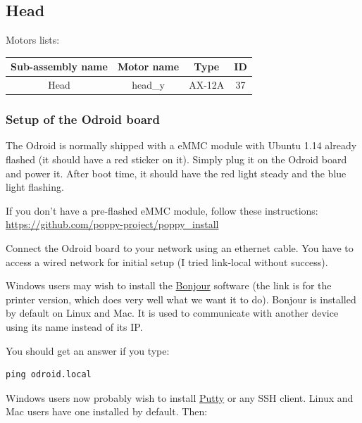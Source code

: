 \documentclass{article}
\begin{document}
\subsection{Head} 

Motors lists:

\begin{center}

\begin{tabular}{|c|c|c|c|}
\hline 
Sub-assembly name & Motor name & Type & ID \\ 
\hline 

Head & head\_y & AX-12A & 37 \\ 
\hline 
\end{tabular} 
\end{center}

\subsubsection{Setup of the Odroid board}


The Odroid is normally shipped with a eMMC module with Ubuntu 1.14 already flashed (it should have a red sticker on it). Simply plug it on the Odroid board and power it. After boot time, it should have the red light steady and the blue light flashing.

If you don't have a pre-flashed eMMC module, follow these instructions: \url{https://github.com/poppy-project/poppy_install}

\vspace{3mm} Connect the Odroid board to your network using an ethernet cable. You have to access a wired network for initial setup (I tried link-local without success).

Windows users may wish to install the \href{https://support.apple.com/kb/DL999?locale=fr_FR&viewlocale=fr_FR}{Bonjour} software (the link is for the printer version, which does very well what we want it to do). Bonjour is installed by default on Linux and Mac. It is used to communicate with another device using its name instead of its IP.

You should get an answer if you type:

\begin{verbatim}
ping odroid.local
\end{verbatim}

Windows users now probably wish to install \href{http://www.putty.org/}{Putty} or any SSH client. Linux and Mac users have one installed by default. Then:
\end{document}
